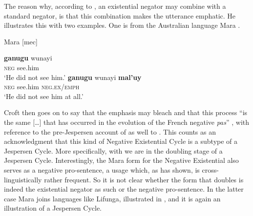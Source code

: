 ﻿\documentclass[output=paper,draft,draftmode,colorlinks,citecolor=brown]{langscibook}
\begin{document}
The reason why, according to \textcite[13--14]{Croft1991}, an existential
negator may combine with a standard negator, is that this combination makes
the utterance emphatic. He illustrates this with two examples. One is from
the Australian language Mara \parencite[289]{Heath1981}.
%
\begin{exe}\ex\label{ex:int-mara-see}
          Mara [mec]
          \begin{xlist}
    \ex \gll \textbf{ganugu}  wunayi \\
\textsc{neg}    see.him \\
    \glt `He did not see him.'
    \ex\label{ex:int-mara-see-at-all}
    \gll \textbf{ganugu}  wunayi  \textbf{mal'uy}\\
\textsc{neg}    see.him  \textsc{neg.ex/emph}\\
    \glt `He did not see him at all.'
    \end{xlist}\end{exe}
%
Croft then goes on to say that the emphasis may bleach and that this
process ``is the same [\ldots] that has occurred in the evolution of the French
negative \textit{pas}'' \parencite[14]{Croft1991}, with reference to the
pre-Jespersen account of \citet{Meillet1912} as well to
\textcites{Schwegler1983}{Schwegler1988}. This counts as an acknowledgment
that this kind of Negative
Existential Cycle is a subtype of a Jespersen Cycle. More specifically,
with  we are in the doubling stage of a Jespersen Cycle.
Interestingly, the Mara form for the Negative Existential also serves as a
negative pro-sentence, a usage which, as \textcite[127]{Veselinova2013}
has shown, is cross-linguistically rather frequent. So it is not clear
whether the form that doubles is indeed the existential negator as such or
the negative pro-sentence. In the latter case Mara joins languages like
Lifunga, illustrated in , and it is again an
illustration of a Jespersen Cycle. 
\end{document}
